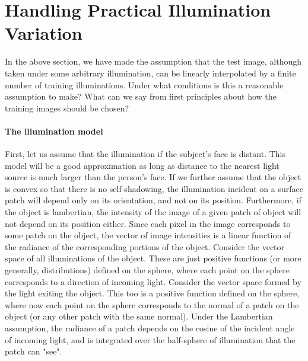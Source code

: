 \section{Handling Practical Illumination Variation}\label{sec:illumination}\vspace{0mm}
In the above section, we have made the assumption that the test image, although taken under some arbitrary illumination, can be linearly interpolated by a finite number of training illuminations.  Under what conditions is this a reasonable assumption to make?  What can we say from first principles about how the training images should be chosen?  

\paragraph{The illumination model}
First, let us assume that the illumination if the subject's face is distant.  This model will be a good approximation as long as distance to the nearest light source is much larger than the person's face.  If we further assume that the object is convex so that there is no self-shadowing, the illumination incident on a surface patch will depend only on its orientation, and not on its position.  Furthermore, if the object is lambertian, the intensity of the image of a given patch of object will not depend on its position either.  Since each pixel in the image corresponds to some patch on the object, the vector of image intensities is a linear function of the radiance of the corresponding portions of the object.  Consider the vector space of all illuminations of the object.  These are just positive functions (or more generally, distributions) defined on the sphere, where each point on the sphere corresponds to a direction of incoming light.  Consider the vector space formed by the light exiting the object.  This too is a positive function defined on the sphere, where now each point on the sphere corresponds to the normal of a patch on the object (or any other patch with the same normal).  Under the Lambertian assumption, the radiance of a patch depends on the cosine of the incident angle of incoming light, and is integrated over the half-sphere of illumination that the patch can "see".
